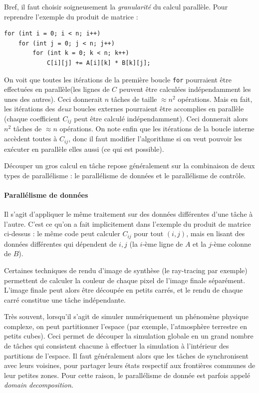 Bref, il faut choisir soigneusement la \emph{granularité} du calcul
parallèle. Pour reprendre l'exemple du produit de matrice :

\begin{verbatim}
for (int i = 0; i < n; i++)
    for (int j = 0; j < n; j++)
        for (int k = 0; k < n; k++)
            C[i][j] += A[i][k] * B[k][j];
\end{verbatim}

On voit que toutes les itérations de la première boucle \texttt{for} pourraient
être effectuées \og en parallèle\fg (les lignes de $C$ peuvent être calculées
indépendamment les unes des autres). Ceci donnerait $n$ tâches de taille
$\approx n^2$ opérations. Mais en fait, les itérations des \emph{deux} boucles
externes pourraient être accomplies en parallèle (chaque coefficient $C_{ij}$
peut être calculé indépendamment). Ceci donnerait alors $n^2$ tâches de
$\approx n$ opérations. On note enfin que les itérations de la boucle interne
accèdent toutes à $C_{ij}$, donc il faut modifier l'algorithme si on veut
pouvoir les exécuter en parallèle elles aussi (ce qui est possible).

Découper un gros calcul en tâche repose généralement sur la combinaison de deux
types de parallélisme : le parallélisme de données et le parallélisme de contrôle.

\paragraph{Parallélisme de données} Il s'agit d'appliquer le même traitement sur
des données différentes d'une tâche à l'autre. C'est ce qu'on a fait
implicitement dans l'exemple du produit de matrice ci-dessus : le même code peut
calculer $C_{ij}$ pour tout $(i, j)$, mais en lisant des données différentes qui
dépendent de $i,j$ (la $i$-ème ligne de $A$ et la $j$-ème colonne de $B$).

Certaines techniques de rendu d'image de synthèse (le ray-tracing par exemple)
permettent de calculer la couleur de chaque pixel de l'image finale
séparément. L'image finale peut alors être découpée en petits carrés, et le
rendu de chaque carré constitue une tâche indépendante.

Très souvent, lorsqu'il s'agit de simuler numériquement un phénomène physique
complexe, on peut partitionner l'espace (par exemple, l'atmosphère terrestre en
petits cubes). Ceci permet de découper la simulation globale en un grand nombre
de tâches qui consistent chacune à effectuer la simulation à l'intérieur des
partitions de l'espace. Il faut généralement alors que les tâches de
synchronisent avec leurs \og voisines\fg, pour partager leurs états respectif
aux frontières communes de leur petites zones. Pour cette raison, le
parallélisme de donnée est parfois appelé \og \textit{domain decomposition}\fg.

